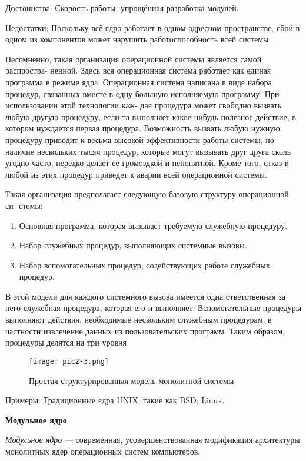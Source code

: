 Достоинства: Скорость работы, упрощённая разработка модулей.

Недостатки: Поскольку всё ядро работает в одном адресном пространстве, сбой в одном из компонентов может нарушить работоспособность всей системы.

Несомненно, такая организация операционной системы является самой распростра-
ненной. Здесь вся операционная система работает как единая программа в режиме
ядра. Операционная система написана в виде набора процедур, связанных вместе
в одну большую исполняемую программу. При использовании этой технологии каж-
дая процедура может свободно вызвать любую другую процедуру, если та выполняет
какое-нибудь полезное действие, в котором нуждается первая процедура. Возможность
вызвать любую нужную процедуру приводит к весьма высокой эффективности работы
системы, но наличие нескольких тысяч процедур, которые могут вызывать друг друга
сколь угодно часто, нередко делает ее громоздкой и непонятной. Кроме того, отказ
в любой из этих процедур приведет к аварии всей операционной системы.

Такая организация предполагает следующую базовую структуру операционной си-
стемы:
\begin{enumerate}
   \item Основная программа, которая вызывает требуемую служебную процедуру.
   \item Набор служебных процедур, выполняющих системные вызовы.
   \item Набор вспомогательных процедур, содействующих работе служебных процедур.
\end{enumerate}

В этой модели для каждого системного вызова имеется одна ответственная за него служебная процедура, которая его и выполняет. Вспомогательные процедуры выполняют действия, необходимые нескольким служебным процедурам, в частности извлечение данных из пользовательских программ. Таким образом, процедуры делятся на три уровня
\begin{figure}\center
   \texttt{[image: pic2-3.png]}
   \caption{Простая структурированная модель монолитной системы}
\end{figure}

Примеры: Традиционные ядра UNIX, такие как BSD; Linux.
\newline

\textbf{Модульное ядро}

\textit{Модульное ядро} — современная, усовершенствованная модификация архитектуры монолитных ядер операционных систем компьютеров.

